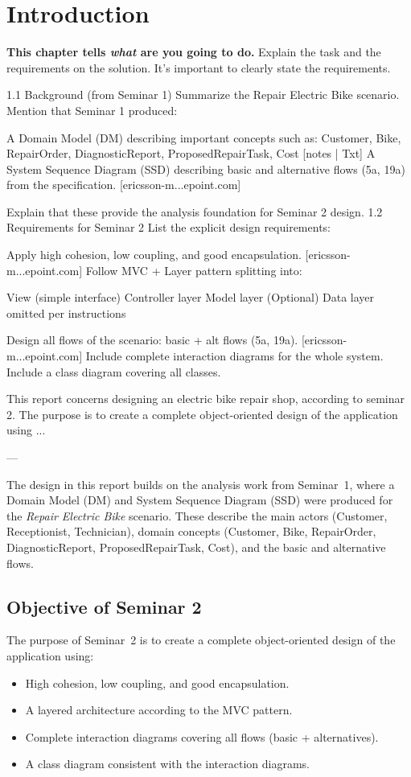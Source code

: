 \documentclass[a4paper]{scrartcl}
\begin{document}
\section{Introduction}
\label{sec:intro}

\textbf{This chapter tells \textit{what} are you going to do.} Explain the task and the requirements on the solution. It's important to clearly state the requirements.

1.1 Background (from Seminar 1)
Summarize the Repair Electric Bike scenario.
Mention that Seminar 1 produced:

A Domain Model (DM) describing important concepts such as:
Customer, Bike, RepairOrder, DiagnosticReport, ProposedRepairTask, Cost [notes | Txt]
A System Sequence Diagram (SSD) describing basic and alternative flows (5a, 19a) from the specification. [ericsson-m...epoint.com]


Explain that these provide the analysis foundation for Seminar 2 design.
1.2 Requirements for Seminar 2
List the explicit design requirements:

Apply high cohesion, low coupling, and good encapsulation. [ericsson-m...epoint.com]
Follow MVC + Layer pattern splitting into:

View (simple interface)
Controller layer
Model layer
(Optional) Data layer omitted per instructions


Design all flows of the scenario: basic + alt flows (5a, 19a). [ericsson-m...epoint.com]
Include complete interaction diagrams for the whole system.
Include a class diagram covering all classes.

This report concerns designing an electric bike repair shop, according to seminar 2. The purpose is to create a complete object-oriented design of the application using ...

---

The design in this report builds on the analysis work from Seminar~1, where a 
Domain Model (DM) and System Sequence Diagram (SSD) were produced for the 
\textit{Repair Electric Bike} scenario. These describe the main actors 
(Customer, Receptionist, Technician), domain concepts (Customer, Bike, RepairOrder, 
DiagnosticReport, ProposedRepairTask, Cost), and the basic and alternative flows.

\subsection{Objective of Seminar 2}
The purpose of Seminar~2 is to create a complete object-oriented design of the 
application using:
\begin{itemize}
  \item High cohesion, low coupling, and good encapsulation.
  \item A layered architecture according to the MVC pattern.
  \item Complete interaction diagrams covering all flows (basic + alternatives).
  \item A class diagram consistent with the interaction diagrams.
\end{itemize}
\end{document}
